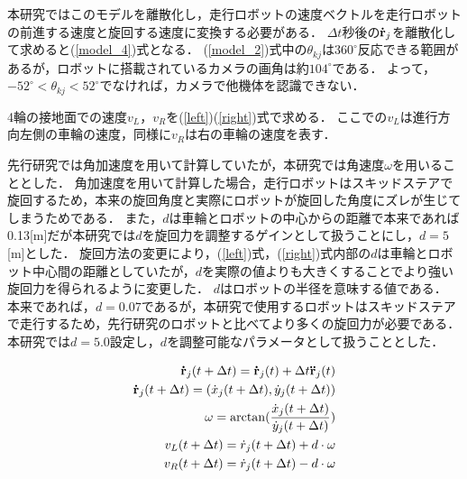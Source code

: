\documentclass[twocolumn,dvipdfmx]{jarticle}
\begin{document}
本研究ではこのモデルを離散化し，走行ロボットの速度ベクトルを走行ロボットの前進する速度と旋回する速度に変換する必要がある．
$\Delta t$秒後の${\bf \dot{r}}_j$を離散化して求めると(\ref{model_4})式となる．
(\ref{model_2})式中の$\theta_{kj}$は$360^{\circ}$反応できる範囲があるが，ロボットに搭載されているカメラの画角は約$104^{\circ}$である．
よって，$ -52^{\circ}< \theta_{kj} < 52^{\circ}$でなければ，カメラで他機体を認識できない．

4輪の接地面での速度$v_L$，$v_R$を(\ref{left})(\ref{right})式で求める．
ここでの$v_L$は進行方向左側の車輪の速度，同様に$v_R$は右の車輪の速度を表す．

先行研究\cite{mygm}では角加速度を用いて計算していたが，本研究では角速度$\omega$を用いることとした．
角加速度を用いて計算した場合，走行ロボットはスキッドステアで旋回するため，本来の旋回角度と実際にロボットが旋回した角度にズレが生じてしまうためである．
また，$d$は車輪とロボットの中心からの距離で本来であれば0.13[m]だが本研究では$d$を旋回力を調整するゲインとして扱うことにし，$d=5$[m]とした．
旋回方法の変更により，(\ref{left})式，(\ref{right})式内部の$d$は車輪とロボット中心間の距離としていたが，$d$を実際の値よりも大きくすることでより強い旋回力を得られるように変更した．
$d$はロボットの半径を意味する値である．
本来であれば，$d=0.07$であるが，本研究で使用するロボットはスキッドステアで走行するため，先行研究\cite{yamada}のロボットと比べてより多くの旋回力が必要である．
本研究では$d=5.0$設定し，$d$を調整可能なパラメータとして扱うこととした．


\vspace{-2.5mm}
\begin{eqnarray}
\label{model_4}
{\bf \dot{r}}_j(t+\Delta t) = {\bf \dot{r}}_j(t) + \Delta t {\bf \ddot{r}}_j (t) \\
\label{model_6}
{\bf \dot{r}}_j(t+\Delta t) = (\dot{x}_{j}(t+\Delta t) , \dot{y}_{j}(t+\Delta t))\\
\label{model_omega}
\omega = \arctan(\frac{\dot{x}_{j}(t+\Delta t)}{\dot{y}_{j}(t+\Delta t)}) \\
\label{left}
v_L(t + \Delta t) = \dot{r}_j(t + \Delta t) + d \cdot \omega\\
\label{right}
v_R(t + \Delta t) = \dot{r}_j(t + \Delta t) - d \cdot \omega
\end{eqnarray}
\end{document}
